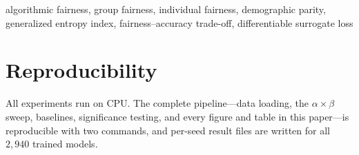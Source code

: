\documentclass[conference]{IEEEtran}
\begin{document}
\begin{IEEEkeywords}
algorithmic fairness, group fairness, individual fairness, demographic parity,
generalized entropy index, fairness--accuracy trade-off, differentiable
surrogate loss
\end{IEEEkeywords}










\section*{Reproducibility}
All experiments run on CPU. The complete pipeline---data loading, the
$\alpha\times\beta$ sweep, baselines, significance testing, and every figure
and table in this paper---is reproducible with two commands, and per-seed
result files are written for all $2{,}940$ trained models.



\end{document}
